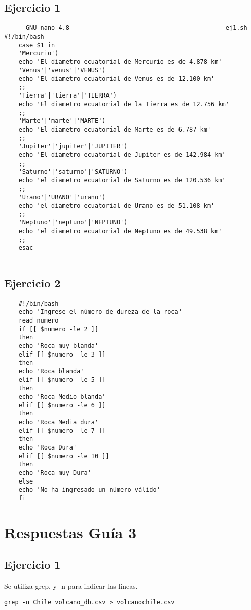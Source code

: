 \subsection{Ejercicio 1}

\begin{verbatim}
	  GNU nano 4.8                                           ej1.sh                                                      #!/bin/bash
	case $1 in
	'Mercurio')
	echo 'El diametro ecuatorial de Mercurio es de 4.878 km'
	'Venus'|'venus'|'VENUS')
	echo 'El diametro ecuatorial de Venus es de 12.100 km'
	;;
	'Tierra'|'tierra'|'TIERRA')
	echo 'El diametro ecuatorial de la Tierra es de 12.756 km'
	;;
	'Marte'|'marte'|'MARTE')
	echo 'El diametro ecuatorial de Marte es de 6.787 km'
	;;
	'Jupiter'|'jupiter'|'JUPITER')
	echo 'El diametro ecuatorial de Jupiter es de 142.984 km'
	;;
	'Saturno'|'saturno'|'SATURNO')
	echo 'el diametro ecuatorial de Saturno es de 120.536 km'
	;;
	'Urano'|'URANO'|'urano')
	echo 'el diametro ecuatorial de Urano es de 51.108 km'
	;;
	'Neptuno'|'neptuno'|'NEPTUNO')
	echo 'el diametro ecuatorial de Neptuno es de 49.538 km'
	;;
	esac
	
\end{verbatim}
\newpage
\subsection{Ejercicio 2}
\begin{verbatim}
	#!/bin/bash
	echo 'Ingrese el número de dureza de la roca'
	read numero
	if [[ $numero -le 2 ]]
	then
	echo 'Roca muy blanda'
	elif [[ $numero -le 3 ]]
	then
	echo 'Roca blanda'
	elif [[ $numero -le 5 ]]
	then
	echo 'Roca Medio blanda'
	elif [[ $numero -le 6 ]]
	then
	echo 'Roca Media dura'
	elif [[ $numero -le 7 ]]
	then
	echo 'Roca Dura'
	elif [[ $numero -le 10 ]]
	then
	echo 'Roca muy Dura'
	else
	echo 'No ha ingresado un número válido'
	fi
\end{verbatim}
\newpage
\section{Respuestas Guía 3}
\subsection{Ejercicio 1}
Se utiliza grep, y -n para indicar las lineas.\\
\begin{verbatim}
grep -n Chile volcano_db.csv > volcanochile.csv
\end{verbatim}
